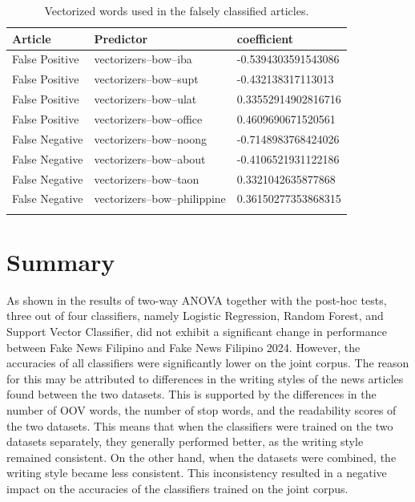 \begin{table}
    \begin{tabularx}{\textwidth}{|l|l|l|}
        \hline
        Article & Predictor & coefficient \\
        \hline
        False Positive & vectorizers--bow--iba & -0.5394303591543086\\
        \hline
        False Positive & vectorizers--bow--supt & -0.432138317113013\\
        \hline
        False Positive & vectorizers--bow--ulat & 0.33552914902816716\\
        \hline
        False Positive & vectorizers--bow--office & 0.4609690671520561\\
        \hline
        False Negative & vectorizers--bow--noong & -0.7148983768424026\\
        \hline
        False Negative & vectorizers--bow--about & -0.4106521931122186\\
        \hline
        False Negative & vectorizers--bow--taon & 0.3321042635877868\\
        \hline
        False Negative & vectorizers--bow--philippine & 0.36150277353868315\\
        \hline
    \caption{Vectorized words used in the falsely classified articles.}
    \label{tab::pred_false_class_vect}
    \end{tabularx}
\end{table}

\pagebreak

\section{Summary} \label{dataset-limitation}

As shown in the results of two-way ANOVA together with the post-hoc tests, three out of four classifiers, namely Logistic Regression, Random Forest, and Support Vector Classifier, did not exhibit a significant change in performance between Fake News Filipino and Fake News Filipino 2024. However, the accuracies of all classifiers were significantly lower on the joint corpus. The reason for this may be attributed to differences in the writing styles of the news articles found between the two datasets. This is supported by the differences in the number of OOV words, the number of stop words, and the readability scores of the two datasets. This means that when the classifiers were trained on the two datasets separately, they generally performed better, as the writing style remained consistent. On the other hand, when the datasets were combined, the writing style became less consistent. This inconsistency resulted in a negative impact on the accuracies of the classifiers trained on the joint corpus.


